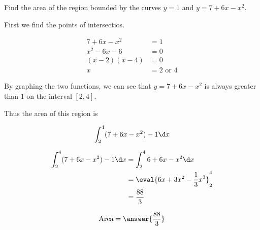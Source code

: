 \documentclass{ximera}
\author{Steven Gubkin}
\begin{document}
\begin{exercise}



Find the area of the region bounded by the curves $y = 1$ and $y =7+6x-x^2$.

\begin{hint}
	First we find the points of intersectios.
	
	\begin{align*}
	7+6x-x^2 &= 1\\
	x^2-6x-6 &=0\\
	(x-2)(x-4) &=0\\
	x &= 2 \textrm{ or  }4
	\end{align*}
\end{hint}

\begin{hint}
	By graphing the two functions, we can see that $y =7+6x-x^2$ is always greater than $1$ on the interval $[2,4]$.
\end{hint}

\begin{hint}
	Thus the area of this region is

	\[
	\int_2^4 (7+6x-x^2) - 1 \d x
	\]
\end{hint}

\begin{hint}
	\begin{align*}
		\int_2^4 (7+6x-x^2) - 1 \d x &= \int_2^4 6+6x-x^2 \d x\\
		&= \eval{6x+3x^2-\frac{1}{3}x^3}_2^4\\
		&= \frac{88}{3}
	\end{align*}
\end{hint}

\begin{prompt}
	\[
		\textrm{Area} = \answer{\frac{88}{3}}
	\]
\end{prompt}

\end{exercise}
\end{document}

